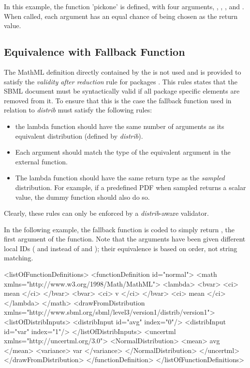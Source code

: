 \documentclass[draftspec]{sbmlpkgspec}
\newcommand{\distribshort}{\emph{distrib}\xspace}
\newcommand{\mathml}{MathML\xspace}
\begin{document}
In this example, the function 'pickone' is defined, with four arguments, , , , and .  When called, each argument has an equal chance of being chosen as the return value.


\subsection{Equivalence with Fallback Function}
\label{sec:fallbackfunc}

The \mathml definition directly contained by the
 is not used and is provided to
satisfy the \emph{validity after reduction} rule for packages
\cite{sbmll3v1packrule}. This rules states that the SBML document must
be syntactically valid if all package specific elements are removed
from it. To ensure that this is the case the fallback function used in
relation to \distribshort must satisfy the following rules:

\begin{itemize}
\item the lambda function should have the same number of arguments as
  its equivalent distribution (defined by \distribshort).
\item Each argument should match the type of the equivalent argument
  in the external function.
\item The lambda function should have the same return type as the
  \emph{sampled} distribution. For example, if a predefined PDF when
  sampled returns a scalar value, the dummy function should also do so.
\end{itemize}

Clearly, these rules can only be enforced by a \distribshort-aware validator.

In the following example, the fallback function is coded to simply return , the first argument of the function.  Note that the arguments have been given different local IDs ( and  instead of  and ); their equivalence is based on order, not string matching.

\begin{example}
  <listOfFunctionDefinitions>
    <functionDefinition id="normal">
      <math xmlns="http://www.w3.org/1998/Math/MathML">
        <lambda>
          <bvar>
            <ci> mean </ci>
          </bvar>
          <bvar>
            <ci> v </ci>
          </bvar>
          <ci> mean </ci>
        </lambda>
      </math>
      <drawFromDistribution xmlns="http://www.sbml.org/sbml/level3/version1/distrib/version1">
        <listOfDistribInputs>
          <distribInput id="avg" index="0"/>
          <distribInput id="var" index="1"/>
        </listOfDistribInputs>
        <uncertml xmlns="http://uncertml.org/3.0">
          <NormalDistribution>
            <mean> avg </mean>
            <variance> var </variance>
          </NormalDistribution>
        </uncertml>
      </drawFromDistribution>
    </functionDefinition>
  </listOfFunctionDefinitions>
\end{example}
\end{document}
